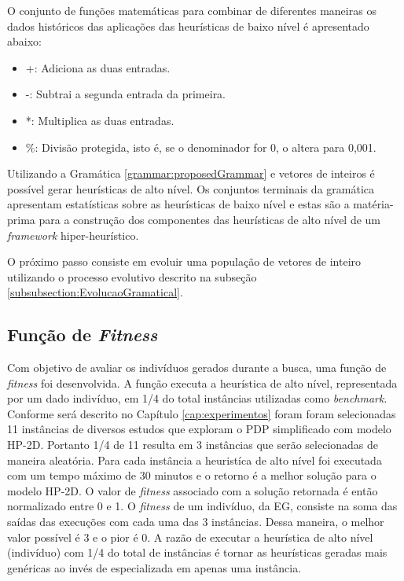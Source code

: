  
  
  O conjunto de funções matemáticas para combinar de diferentes maneiras os dados históricos das aplicações das heurísticas de baixo nível é apresentado abaixo:
  
  \begin{itemize}
  	\item +: Adiciona as duas entradas.
  	\item -: Subtrai a segunda entrada da primeira.
  	\item *: Multiplica as duas entradas.
  	\item \%: Divisão protegida, isto é, se o denominador for 0, o altera para 0,001.
  \end{itemize}
  
  
  Utilizando a Gramática \ref{grammar:proposedGrammar} e vetores de inteiros é possível gerar heurísticas de alto nível. Os conjuntos terminais da gramática apresentam estatísticas sobre as heurísticas de baixo nível e estas são a matéria-prima para a construção dos componentes das heurísticas de alto nível de um \textit{framework} hiper-heurístico. 
  
  

  
  O próximo passo consiste em evoluir uma população de vetores de inteiro utilizando o processo evolutivo descrito na subseção 
	  \ref{subsubsection:EvolucaoGramatical}. %
  
  
  \subsection{Função de \textit{Fitness}}
  \label{sub:funcfitness}
  
  
  	
 Com objetivo de avaliar os indivíduos gerados durante a busca, uma função de \textit{fitness} foi desenvolvida. A função executa a heurística de alto nível, representada por um dado indivíduo, 
 em 1/4 do total instâncias utilizadas como \textit{benchmark}. Conforme será descrito no Capítulo \ref{cap:experimentos} foram   foram selecionadas 11 instâncias de diversos estudos que exploram o PDP simplificado com modelo HP-2D. Portanto 1/4 de 11 resulta em 3 instâncias que serão selecionadas de maneira aleatória. Para cada instância a heuristíca de alto nível foi executada com um tempo máximo de 30 minutos e o retorno é a melhor solução para o modelo HP-2D. O valor de \textit{fitness} associado com a solução retornada é então normalizado entre 0 e 1. O \textit{fitness} de um indivíduo, da EG, consiste na soma das saídas das execuções com cada uma das 3 instâncias. Dessa maneira, o melhor valor possível é 3 e o pior é 0. A razão de executar a heurística de alto nível (indivíduo) com 1/4 do total de instâncias é tornar as heurísticas geradas mais genéricas ao invés de especializada em apenas uma instância. 
  
